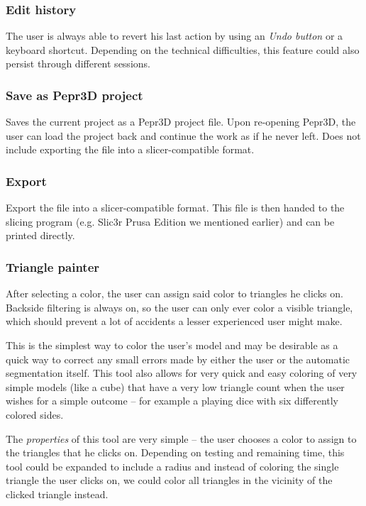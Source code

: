 \subsubsection{Edit history}
The user is always able to revert his last action by using an \textit{Undo button} or a keyboard shortcut. Depending on the technical difficulties, this feature could also persist through different sessions.

\subsubsection{Save as Pepr3D project}
Saves the current project as a Pepr3D project file. Upon re-opening Pepr3D, the user can load the project back and continue the work as if he never left. Does not include exporting the file into a slicer-compatible format.

\subsubsection{Export}
Export the file into a slicer-compatible format. This file is then handed to the slicing program (e.g. Slic3r Prusa Edition we mentioned earlier) and can be printed directly.

\subsubsection{Triangle painter}
After selecting a color, the user can assign said color to triangles he clicks on. Backside filtering is always on, so the user can only ever color a visible triangle, which should prevent a lot of accidents a lesser experienced user might make.

This is the simplest way to color the user's model and may be desirable as a quick way to correct any small errors made by either the user or the automatic segmentation itself. This tool also allows for very quick and easy coloring of very simple models (like a cube) that have a very low triangle count when the user wishes for a simple outcome -- for example a playing dice with six differently colored sides.

The \textit{properties} of this tool are very simple -- the user chooses a color to assign to the triangles that he clicks on. Depending on testing and remaining time, this tool could be expanded to include a radius and instead of coloring the single triangle the user clicks on, we could color all triangles in the vicinity of the clicked triangle instead.

